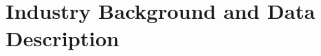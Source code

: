 \documentclass[reviewmode]{restat}
\begin{document}


\section{Industry Background and Data Description}
\label{sec:background}
\end{document}
